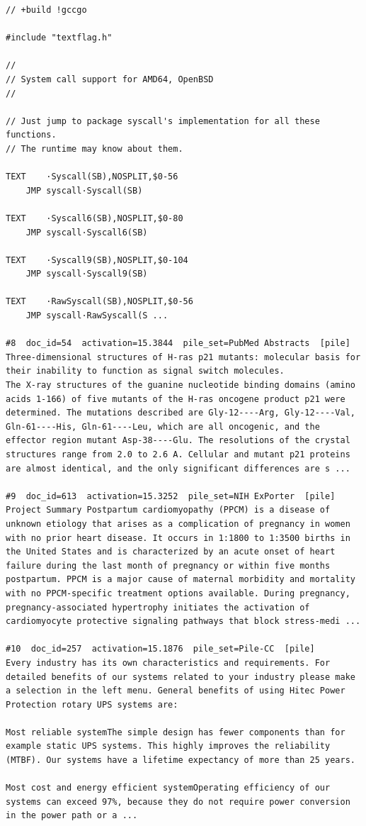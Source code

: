 \begin{verbatim}
// +build !gccgo

#include "textflag.h"

//
// System call support for AMD64, OpenBSD
//

// Just jump to package syscall's implementation for all these functions.
// The runtime may know about them.

TEXT	·Syscall(SB),NOSPLIT,$0-56
	JMP	syscall·Syscall(SB)

TEXT	·Syscall6(SB),NOSPLIT,$0-80
	JMP	syscall·Syscall6(SB)

TEXT	·Syscall9(SB),NOSPLIT,$0-104
	JMP	syscall·Syscall9(SB)

TEXT	·RawSyscall(SB),NOSPLIT,$0-56
	JMP	syscall·RawSyscall(S ...

#8  doc_id=54  activation=15.3844  pile_set=PubMed Abstracts  [pile]
Three-dimensional structures of H-ras p21 mutants: molecular basis for their inability to function as signal switch molecules.
The X-ray structures of the guanine nucleotide binding domains (amino acids 1-166) of five mutants of the H-ras oncogene product p21 were determined. The mutations described are Gly-12----Arg, Gly-12----Val, Gln-61----His, Gln-61----Leu, which are all oncogenic, and the effector region mutant Asp-38----Glu. The resolutions of the crystal structures range from 2.0 to 2.6 A. Cellular and mutant p21 proteins are almost identical, and the only significant differences are s ...

#9  doc_id=613  activation=15.3252  pile_set=NIH ExPorter  [pile]
Project Summary Postpartum cardiomyopathy (PPCM) is a disease of unknown etiology that arises as a complication of pregnancy in women with no prior heart disease. It occurs in 1:1800 to 1:3500 births in the United States and is characterized by an acute onset of heart failure during the last month of pregnancy or within five months postpartum. PPCM is a major cause of maternal morbidity and mortality with no PPCM-specific treatment options available. During pregnancy, pregnancy-associated hypertrophy initiates the activation of cardiomyocyte protective signaling pathways that block stress-medi ...

#10  doc_id=257  activation=15.1876  pile_set=Pile-CC  [pile]
Every industry has its own characteristics and requirements. For detailed benefits of our systems related to your industry please make a selection in the left menu. General benefits of using Hitec Power Protection rotary UPS systems are:

Most reliable systemThe simple design has fewer components than for example static UPS systems. This highly improves the reliability (MTBF). Our systems have a lifetime expectancy of more than 25 years.

Most cost and energy efficient systemOperating efficiency of our systems can exceed 97%, because they do not require power conversion in the power path or a ...

\end{verbatim}

